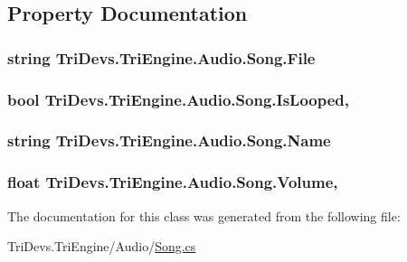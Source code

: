 \subsection{Property Documentation}
\hypertarget{class_tri_devs_1_1_tri_engine_1_1_audio_1_1_song_a45e8f65c5940970aadd2af22a7bdd7f7}{
\subsubsection[{File}]{\setlength{\rightskip}{0pt plus 5cm}string Tri\-Devs.\-Tri\-Engine.\-Audio.\-Song.\-File\hspace{0.3cm}{\ttfamily [get]}}}\label{class_tri_devs_1_1_tri_engine_1_1_audio_1_1_song_a45e8f65c5940970aadd2af22a7bdd7f7}
\hypertarget{class_tri_devs_1_1_tri_engine_1_1_audio_1_1_song_ad70f2136b786a71c62c65e9638a7e5b1}{
\subsubsection[{Is\-Looped}]{\setlength{\rightskip}{0pt plus 5cm}bool Tri\-Devs.\-Tri\-Engine.\-Audio.\-Song.\-Is\-Looped\hspace{0.3cm}{\ttfamily [get]}, {\ttfamily [set]}}}\label{class_tri_devs_1_1_tri_engine_1_1_audio_1_1_song_ad70f2136b786a71c62c65e9638a7e5b1}
\hypertarget{class_tri_devs_1_1_tri_engine_1_1_audio_1_1_song_ae6d1a2f4b6016b59e15fe30048de7000}{
\subsubsection[{Name}]{\setlength{\rightskip}{0pt plus 5cm}string Tri\-Devs.\-Tri\-Engine.\-Audio.\-Song.\-Name\hspace{0.3cm}{\ttfamily [get]}}}\label{class_tri_devs_1_1_tri_engine_1_1_audio_1_1_song_ae6d1a2f4b6016b59e15fe30048de7000}
\hypertarget{class_tri_devs_1_1_tri_engine_1_1_audio_1_1_song_a0d7bc9f46b073f2c317e54f4b123c781}{
\subsubsection[{Volume}]{\setlength{\rightskip}{0pt plus 5cm}float Tri\-Devs.\-Tri\-Engine.\-Audio.\-Song.\-Volume\hspace{0.3cm}{\ttfamily [get]}, {\ttfamily [set]}}}\label{class_tri_devs_1_1_tri_engine_1_1_audio_1_1_song_a0d7bc9f46b073f2c317e54f4b123c781}


The documentation for this class was generated from the following file\-:\begin{DoxyCompactItemize}
\item 
Tri\-Devs.\-Tri\-Engine/\-Audio/\hyperlink{_song_8cs}{Song.\-cs}\end{DoxyCompactItemize}
